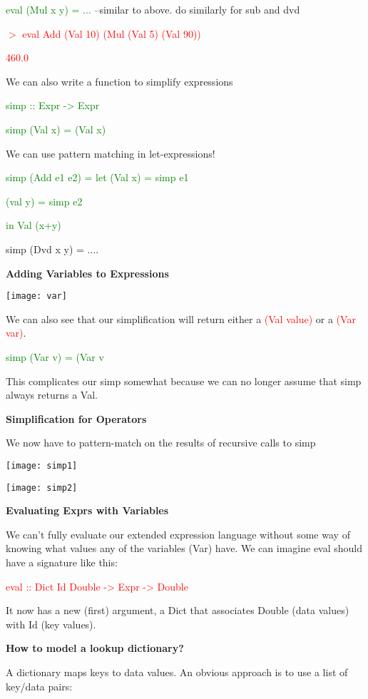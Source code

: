 \documentclass{article}
\begin{document}
\textcolor{green}{eval  (Mul  x  y) = ...} --similar to above. do similarly for sub and dvd

\textcolor{red}{$>$ eval Add  (Val 10)  (Mul  (Val 5)  (Val 90))}

\textcolor{red}{460.0}

We can also write a function to simplify expressions

\textcolor{green}{simp  ::  Expr -> Expr}

\textcolor{green}{simp  (Val x) = (Val x)}

We can use pattern matching in let-expressions!

\textcolor{green}{simp (Add  e1  e2) = let  (Val x) = simp e1}

\textcolor{green}{(val y) = simp e2}

\textcolor{green}{in Val (x+y)}

simp  (Dvd  x  y) = ....


\textbf{Adding Variables to Expressions}

\texttt{[image: var]}

We can also see that our simplification will return either a \textcolor{red}{(Val value)} or a \textcolor{red}{(Var var)}.

\textcolor{green}{simp  (Var v) = (Var v}

This complicates our simp somewhat because we can no longer assume that simp always returns a Val.

\textbf{Simplification for Operators}

We now have to pattern-match on the results of recursive calls to simp

\texttt{[image: simp1]}

\texttt{[image: simp2]}


\textbf{Evaluating Exprs with Variables}

We can't fully evaluate our extended expression language without some way of knowing what values any of the variables (Var) have. We can imagine eval should have a signature like this:

\textcolor{red}{eval :: Dict Id Double -> Expr -> Double}

It now has a new (first) argument, a Dict that associates Double (data values) with Id (key values).


\textbf{How to model a lookup dictionary?}

A dictionary maps keys to data values. An obvious approach is to use a list of key/data pairs:
\end{document}
